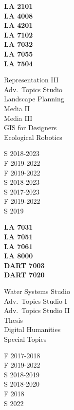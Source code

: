 \documentclass[10pt]{developercv} %
\begin{document}
\begin{minipage}[t]{0.1\textwidth} 
\textbf{LA 2101}\\
\textbf{LA 4008}\\
\textbf{LA 4201}\\
\textbf{LA 7102}\\
\textbf{LA 7032}\\
\textbf{LA 7055}\\
\textbf{LA 7504}\\
\end{minipage}
\begin{minipage}[t]{0.2\textwidth} 
Representation III\\
Adv.~Topics Studio\\
Landscape Planning \\
Media II \\
Media III\\
GIS for Designers\\
Ecological Robotics\\
\end{minipage}
\begin{minipage}[t]{0.15\textwidth} 
S 2018-2023\\
F 2019-2022\\
F 2019-2022\\
S 2018-2023\\
S 2017-2023\\
F 2019-2022\\
S 2019\\
\end{minipage}
\begin{minipage}[t]{0.15\textwidth} 
\textbf{LA 7031}\\
\textbf{LA 7051}\\
\textbf{LA 7061}\\
\textbf{LA 8000}\\
\textbf{DART 7003}\\
\textbf{DART 7020}\\
\end{minipage}
\begin{minipage}[t]{0.25\textwidth} 
Water Systems Studio\\
Adv.~Topics Studio I\\
Adv.~Topics Studio II\\
Thesis\\
Digital Humanities\\
Special Topics\\
\end{minipage}
\begin{minipage}[t]{0.15\textwidth} 
F 2017-2018\\
F 2019-2022\\
S 2018-2019\\
S 2018-2020\\
F 2018\\
S 2022\\
\end{minipage}
\end{document}
